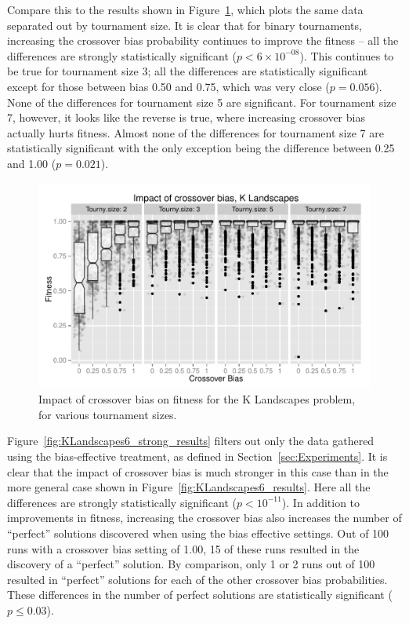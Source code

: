 \documentclass{sig-alternate}
\begin{document}
Compare this to the results shown in Figure~\ref{fig:KLandscapes6_XO_bias_impact_facets}, which plots the same data
separated out by tournament size. It is clear that for binary tournaments, increasing the crossover bias probability
continues to improve the fitness -- all the differences are strongly statistically significant ($p<6\times 10^{-08}$).
This continues to be true for tournament size 3; all the differences are statistically significant except for those
between bias 0.50 and 0.75, which was very close ($p=0.056$). None of the differences for tournament size 5 are
significant. For tournament size 7, however, it looks like the reverse is true, where increasing crossover bias actually
hurts fitness. Almost none of the differences for tournament size 7 are statistically significant with the only
exception being the difference between 0.25 and 1.00 ($p=0.021$).

\begin{figure}[t]
\centering
\includegraphics[width=0.45 \textwidth]{Plots/KLandscapes6_XO_bias_impact_facets.pdf}
\caption{Impact of crossover bias on fitness for the K Landscapes problem, for various tournament sizes.}
\label{fig:KLandscapes6_XO_bias_impact_facets}
\end{figure}

Figure~\ref{fig:KLandscapes6_strong_results} filters out only the data gathered using the bias-effective treatment,
as defined in Section~\ref{sec:Experiments}. It is clear that the impact of crossover bias is much stronger in this case
than in the more general case shown in Figure~\ref{fig:KLandscapes6_results}. Here all the differences are strongly
statistically significant ($p < 10^{-11}$). In addition to improvements in fitness, increasing the crossover bias also
increases the number of ``perfect'' solutions discovered when using the bias effective settings. 
Out of 100 runs with a crossover bias setting of 1.00, 15 of
these runs resulted in the discovery of a ``perfect'' solution. By comparison, only 1 or 2 runs out of 100 resulted in
``perfect'' solutions for each of the other crossover bias probabilities. 
These differences in the number of perfect solutions are statistically significant
($p \leq 0.03$).
\end{document}

